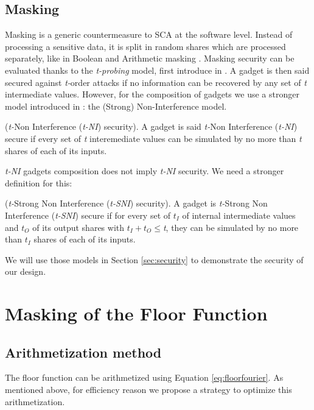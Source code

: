 \documentclass[runningheads]{llncs}
\begin{document}
\subsection{Masking}
Masking is a generic countermeasure to SCA at the software level. Instead of processing a sensitive data, it is split in random shares which are processed separately, like in Boolean and Arithmetic masking \cite{mangard2008power}. Masking security can be evaluated thanks to the \emph{t-probing} model, first introduce in \cite{ishai2003private}. A gadget is then said secured against \emph{t-}order attacks if no information can be recovered by any set of \emph{t} intermediate values. However, for the composition of gadgets we use a stronger model introduced in \cite{barthe2016strong}: the (Strong) Non-Interference model.
\begin{definition}
  (\emph{t-}Non Interference (\emph{t-NI}) security). A gadget is said \emph{t-}Non Interference (\emph{t-NI}) secure if every set of \emph{t} interemediate values can be simulated by no more than \emph{t} shares of each of its inputs.
\end{definition}
\emph{t-NI} gadgets composition does not imply \emph{t-NI} security. We need a stronger definition for this:
\begin{definition}
  (\emph{t-}Strong Non Interference (\emph{t-SNI}) security). A gadget is \emph{t-}Strong Non Interference (\emph{t-SNI}) secure if for every set of $t_I$ of internal intermediate values and $t_O$ of its output shares with $t_I + t_O \leq$\emph{t}, they can be simulated by no more than $t_I$ shares of each of its inputs.
\end{definition}

We will use those models in Section \ref{sec:security} to demonstrate the security of our design.


\section{Masking of the Floor Function}\label{sec:maskfloor}
\subsection{Arithmetization method}
The floor function can be arithmetized using Equation \ref{eq:floorfourier}. As mentioned above, for efficiency reason we propose a strategy to optimize this arithmetization.
\end{document}
